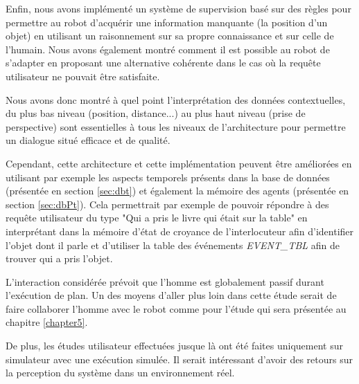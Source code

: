\documentclass[a4paper,11pt,twoside]{StyleThese}
\begin{document}
Enfin, nous avons implémenté un système de supervision basé sur des règles pour permettre au robot d'acquérir une information manquante (la position d'un objet) en utilisant un raisonnement sur sa propre connaissance et sur celle de l'humain.
Nous avons également montré comment il est possible au robot de s'adapter en proposant une alternative cohérente dans le cas où la requête utilisateur ne pouvait être satisfaite.


Nous avons donc montré à quel point l'interprétation des données contextuelles, du plus bas niveau (position, distance...) au plus haut niveau (prise de perspective) sont essentielles à tous les niveaux de l'architecture pour permettre un dialogue situé efficace et de qualité.

Cependant, cette architecture et cette implémentation peuvent être améliorées en utilisant par exemple les aspects temporels présents dans la base de données (présentée en section \ref{sec:dbt}) et également la mémoire des agents (présentée en section \ref{sec:dbPt}). Cela permettrait par exemple de pouvoir répondre à des requête utilisateur du type "Qui a pris le livre qui était sur la table" en interprétant dans la mémoire d'état de croyance de l'interlocuteur afin d'identifier l'objet dont il parle et d'utiliser la table des événements  \textit{EVENT\_TBL} afin de trouver qui a pris l'objet.

L'interaction considérée prévoit que l'homme est globalement passif durant l'exécution de plan. Un des moyens d'aller plus loin dans cette étude serait de faire collaborer l'homme avec le robot comme pour l'étude qui sera présentée au chapitre \ref{chapter5}.

De plus, les études utilisateur effectuées jusque là ont été faites uniquement sur simulateur avec une exécution simulée. Il serait intéressant d'avoir des retours sur la perception du système dans un environnement réel. 


\end{document}
